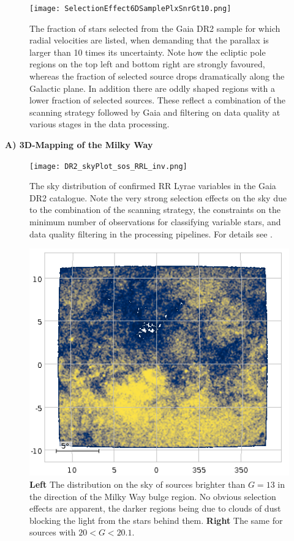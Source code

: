 \begin{figure}
    \centering
    \texttt{[image: SelectionEffect6DSamplePlxSnrGt10.png]}
    \caption{The fraction of stars selected from the Gaia DR2 sample for which radial velocities are listed, when demanding that the parallax is larger than 10 times its uncertainty. Note how the ecliptic pole regions on the top left and bottom right are strongly favoured, whereas the fraction of selected source drops dramatically along the Galactic plane. In addition there are oddly shaped regions with a lower fraction of selected sources. These reflect a combination of the scanning strategy followed by Gaia and filtering on data quality at various stages in the data processing.}
    \label{fig:6dplxsnrgt10}
\end{figure}
\noindent\textbf{A) 3D-Mapping of the Milky Way}

\begin{figure}
    \centering
    \texttt{[image: DR2\_skyPlot\_sos\_RRL\_inv.png]}
    \caption{The sky distribution of confirmed RR Lyrae variables in the Gaia DR2 catalogue. Note the very strong selection effects on the sky due to the combination of the scanning strategy, the constraints on the minimum number of observations for classifying variable stars, and data quality filtering in the processing pipelines. For details see \cite{2018A&A...618A..30H}.}
    \label{fig:rrl}
\end{figure}

\begin{figure}
    \centering
    \includegraphics[width=0.5\linewidth]{img/BulgeRegionGlt13.png}
    \caption{\textbf{Left} The distribution on the sky of sources brighter than $G=13$ in the direction of the Milky Way bulge region. No obvious selection effects are apparent, the darker regions being due to clouds of dust blocking the light from the stars behind them. \textbf{Right} The same for sources with $20<G<20.1$.}
    \label{fig:bulge}
\end{figure}

